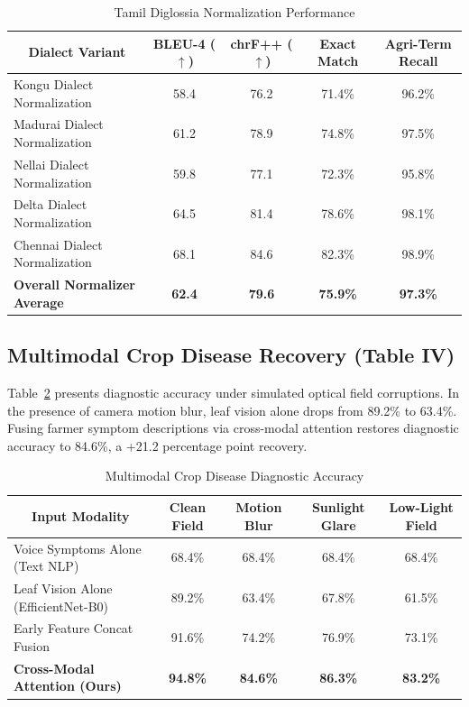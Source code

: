 \documentclass[conference]{IEEEtran}
\begin{document}
\begin{table}[t]
\centering
\caption{Tamil Diglossia Normalization Performance}
\label{tab:diglossia_normalization}
\begin{tabular}{|l|c|c|c|c|}
\hline
\multicolumn{1}{|c|}{\textbf{Dialect Variant}} & \textbf{BLEU-4 ($\uparrow$)} & \textbf{chrF++ ($\uparrow$)} & \textbf{Exact Match} & \textbf{Agri-Term Recall} \\
\hline
Kongu Dialect Normalization      & 58.4 & 76.2 & 71.4\% & 96.2\% \\
\hline
Madurai Dialect Normalization    & 61.2 & 78.9 & 74.8\% & 97.5\% \\
\hline
Nellai Dialect Normalization     & 59.8 & 77.1 & 72.3\% & 95.8\% \\
\hline
Delta Dialect Normalization      & 64.5 & 81.4 & 78.6\% & 98.1\% \\
\hline
Chennai Dialect Normalization    & 68.1 & 84.6 & 82.3\% & 98.9\% \\
\hline
\textbf{Overall Normalizer Average} & \textbf{62.4} & \textbf{79.6} & \textbf{75.9\%} & \textbf{97.3\%} \\
\hline
\end{tabular}
\end{table}

\subsection{Multimodal Crop Disease Recovery (Table IV)}
Table~\ref{tab:multimodal_diagnosis} presents diagnostic accuracy under simulated optical field corruptions. In the presence of camera motion blur, leaf vision alone drops from 89.2\% to 63.4\%. Fusing farmer symptom descriptions via cross-modal attention restores diagnostic accuracy to 84.6\%, a +21.2 percentage point recovery.

\begin{table}[t]
\centering
\caption{Multimodal Crop Disease Diagnostic Accuracy}
\label{tab:multimodal_diagnosis}
\begin{tabular}{|l|c|c|c|c|}
\hline
\multicolumn{1}{|c|}{\textbf{Input Modality}} & \textbf{Clean Field} & \textbf{Motion Blur} & \textbf{Sunlight Glare} & \textbf{Low-Light Field} \\
\hline
Voice Symptoms Alone (Text NLP)   & 68.4\% & 68.4\% & 68.4\% & 68.4\% \\
\hline
Leaf Vision Alone (EfficientNet-B0) & 89.2\% & 63.4\% & 67.8\% & 61.5\% \\
\hline
Early Feature Concat Fusion       & 91.6\% & 74.2\% & 76.9\% & 73.1\% \\
\hline
\textbf{Cross-Modal Attention (Ours)} & \textbf{94.8\%} & \textbf{84.6\%} & \textbf{86.3\%} & \textbf{83.2\%} \\
\hline
\end{tabular}
\end{table}
\end{document}
